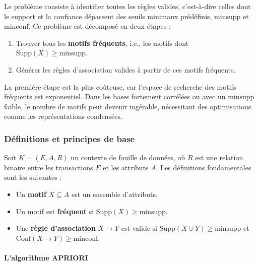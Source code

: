 \documentclass[a4paper,12pt]{report}
\begin{document}
        Le problème consiste à identifier toutes les règles valides, c’est-à-dire celles dont le support et la confiance dépassent des seuils minimaux prédéfinis, \( \text{minsupp} \) et \( \text{minconf} \). Ce problème est décomposé en deux étapes \cite{HGN00} :
        \begin{enumerate}
            \item Trouver tous les \textbf{motifs fréquents}, i.e., les motifs dont \( \text{Supp}(X) \geq \text{minsupp} \).
            \item Générer les règles d’association valides à partir de ces motifs fréquents.
        \end{enumerate}
        
        La première étape est la plus coûteuse, car l’espace de recherche des motifs fréquents est exponentiel. Dans les bases fortement corrélées ou avec un \( \text{minsupp} \) faible, le nombre de motifs peut devenir ingérable, nécessitant des optimisations comme les représentations condensées.
        
        \subsubsection{Définitions et principes de base}
        \label{sec:def_principes}
        
        Soit \( K = (E, A, R) \) un contexte de fouille de données, où \( R \) est une relation binaire entre les transactions \( E \) et les attributs \( A \). Les définitions fondamentales sont les suivantes :
        \begin{itemize}
            \item Un \textbf{motif} \( X \subseteq A \) est un ensemble d’attributs.
            \item Un motif est \textbf{fréquent} si \( \text{Supp}(X) \geq \text{minsupp} \).
            \item Une \textbf{règle d’association} \( X \rightarrow Y \) est valide si \( \text{Supp}(X \cup Y) \geq \text{minsupp} \) et \( \text{Conf}(X \rightarrow Y) \geq \text{minconf} \).
        \end{itemize}
        
        \paragraph{L’algorithme APRIORI}
        
\end{document}
